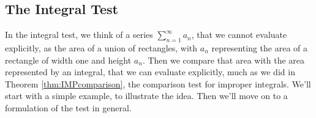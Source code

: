 \subsection{The Integral Test}

In the integral test, we think of a series $\sum_{n=1}^\infty a_n$, that
we cannot evaluate explicitly, as the area of a union of rectangles,
with $a_n$ representing the area of a rectangle of width one and
height $a_n$. Then we compare that area with the area represented
by an integral, that we can evaluate explicitly, much as we did in
Theorem \ref{thm:IMPcomparison}, the comparison test for improper integrals.
We'll start with a simple example,  to illustrate the idea.
Then we'll move on to a formulation of the test in general.

